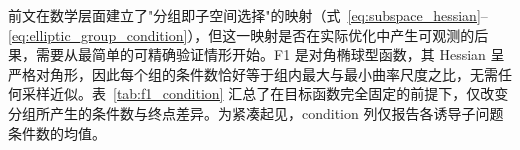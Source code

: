 前文在数学层面建立了"分组即子空间选择"的映射（式~\eqref{eq:subspace_hessian}--\eqref{eq:elliptic_group_condition}），但这一映射是否在实际优化中产生可观测的后果，需要从最简单的可精确验证情形开始。F1 是对角椭球型函数，其 Hessian 呈严格对角形，因此每个组的条件数恰好等于组内最大与最小曲率尺度之比，无需任何采样近似。表~\ref{tab:f1_condition} 汇总了在目标函数完全固定的前提下，仅改变分组所产生的条件数与终点差异。为紧凑起见，condition 列仅报告各诱导子问题条件数的均值。
